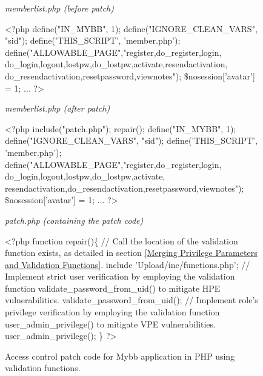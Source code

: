 \documentclass[10pt,journal,compsoc]{IEEEtran}
\begin{document}
\begin{CJK}{UTF8}{gbsn}
\begin{figure*}[h]
\begin{minipage}[t]{0.48\textwidth}
\begin{algorithm}[H]
\renewcommand{\thealgorithm}{}
\small
{}
\caption{\textit{memberlist.php (before patch)}}
\begin{algorithmic}[1]
\State \textless?php
\State define("IN\_MYBB", 1);
\State define("IGNORE\_CLEAN\_VARS", "sid");
\State define('THIS\_SCRIPT', 'member.php');
\State define("ALLOWABLE\_PAGE","register,do\_register,login,
do\_login,logout,lostpw,do\_lostpw,activate,resendactivation,
do\_resendactivation,resetpassword,viewnotes");
\State \$nosession['avatar'] = 1;
\State ...
\State ?\textgreater 
\end{algorithmic}
\end{algorithm}
\end{minipage}
\hfill
\begin{minipage}[t]{0.48\textwidth}
\begin{algorithm}[H]
\small
\renewcommand{\thealgorithm}{}
\caption{\textit{memberlist.php (after patch)}}
\begin{algorithmic}[1]
\State \textless?php
\State \textcolor[rgb]{0.16,0.32,0.66}{include("patch.php");}
\State \textcolor[rgb]{0.16,0.32,0.66}{repair();}
\State define("IN\_MYBB", 1);
\State define("IGNORE\_CLEAN\_VARS", "sid");
\State define('THIS\_SCRIPT', 'member.php');
\State define("ALLOWABLE\_PAGE","register,do\_register,login,
do\_login,logout,lostpw,do\_lostpw,activate,
resendactivation,do\_resendactivation,resetpassword,viewnotes");
\State \$nosession['avatar'] = 1;
\State ...
\State ?\textgreater 
\end{algorithmic}
\end{algorithm}
\end{minipage}
\hfill
\begin{minipage}[t]{1\textwidth}
\begin{algorithm}[H]
\small
\renewcommand{\thealgorithm}{}
\caption{\textit{patch.php (containing the patch code)}}
\begin{algorithmic}[1]
\State \textless?php 
\State function repair()\{
\Statex \textcolor[rgb]{0.16,0.32,0.66}{// Call the location of the validation function exists, as detailed in section \ref{Merging Privilege Parameters and Validation Functions}.}
\State include 'Upload/inc/functions.php';
\Statex \textcolor[rgb]{0.16,0.32,0.66}{// Implement strict user verification by employing the validation function validate\_password\_from\_uid() to mitigate HPE vulnerabilities.}
\State validate\_password\_from\_uid();
\Statex \textcolor[rgb]{0.16,0.32,0.66}{// Implement role's privilege verification by employing the validation function user\_admin\_privilege() to mitigate VPE vulnerabilities.}
\State user\_admin\_privilege();
\State \}
\State ?\textgreater 
\end{algorithmic}
\end{algorithm}
\end{minipage}%
\caption{Access control patch code for Mybb application in PHP using validation functions.}
\label{Mybb}
\end{figure*}


\end{CJK}
\end{document}
